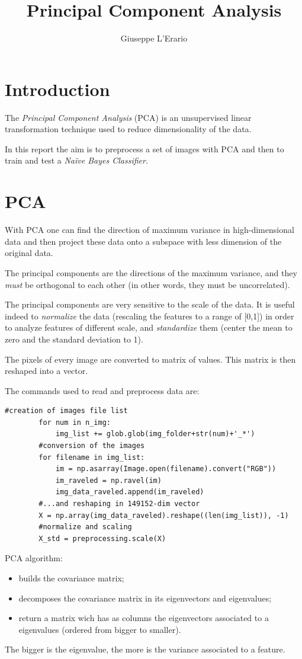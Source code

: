 \documentclass[10pt,a4paper]{article}
\author{Giuseppe L'Erario}
\date{}
\title{Principal Component Analysis}
\begin{document}
	\maketitle
	
	\section*{Introduction}
	The \emph{Principal Component Analysis} (PCA) is an unsupervised linear transformation technique used to reduce dimensionality of the data. 
	
	In this report the aim is to preprocess a set of images with PCA and then to train and test a \emph{Na\"ive Bayes Classifier}.
	
	\section{PCA}
	With PCA one can find the direction of maximum variance in high-dimensional data and then project these data onto a subspace with less dimension of the original data. 
	
	The principal components are the directions of the maximum variance, and they \emph{must} be orthogonal to each other (in other words, they must be uncorrelated). 
	
	The principal components are very sensitive to the scale of the data. It is useful indeed to \emph{normalize} the data (rescaling the features to a range of [0,1]) in order to analyze features of different scale, and \emph{standardize} them (center the mean to zero and the standard deviation to 1). 

	The pixels of every image are converted to matrix of values. This matrix is then reshaped into a vector.
	
	The commands used to read and preprocess data are:
	\begin{Verbatim}[obeytabs,tabsize=4]
		#creation of images file list
		for num in n_img:
			img_list += glob.glob(img_folder+str(num)+'_*')
		#conversion of the images
		for filename in img_list:
			im = np.asarray(Image.open(filename).convert("RGB"))
			im_raveled = np.ravel(im)
			img_data_raveled.append(im_raveled)
		#...and reshaping in 149152-dim vector
		X = np.array(img_data_raveled).reshape((len(img_list)), -1)
		#normalize and scaling
		X_std = preprocessing.scale(X)
	\end{Verbatim}  
	PCA algorithm:
	\begin{itemize}
		\item builds the covariance matrix;
		\item decomposes the covariance matrix in its eigenvectors and eigenvalues;
		\item return a matrix wich has as columns the eigenvectors associated to a eigenvalues (ordered from bigger to smaller). 
	\end{itemize}
	The bigger is the eigenvalue, the more is the variance associated to a feature.
	
\end{document}
